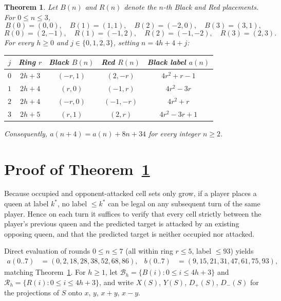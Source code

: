 \documentclass[11pt]{article}
\newtheorem{theorem}{Theorem}
\begin{document}
\begin{theorem}\label{thm:main}
Let $B(n)$ and $R(n)$ denote the $n$-th Black and Red placements. For $0 \le n \le 3$,
\[
  B(0) = (0,0),\quad B(1) = (1,1),\quad B(2) = (-2,0),\quad B(3) = (3,1),
\]
\[
  R(0) = (2,-1),\quad R(1) = (-1,2),\quad R(2) = (-1,-2),\quad R(3) = (2,3).
\]
For every $h \ge 0$ and $j \in \{0, 1, 2, 3\}$, setting $n = 4h + 4 + j$:
\begin{center}
\begin{tabular}{@{}ccccc@{}}
\toprule
$j$ & Ring $r$ & Black $B(n)$ & Red $R(n)$ & Black label $a(n)$ \\
\midrule
$0$ & $2h + 3$ & $(-r, 1)$ & $(2, -r)$ & $4r^2 + r - 1$ \\
$1$ & $2h + 4$ & $(r, 0)$ & $(-1, r)$ & $4r^2 - 3r$ \\
$2$ & $2h + 4$ & $(-r, 0)$ & $(-1, -r)$ & $4r^2 + r$ \\
$3$ & $2h + 5$ & $(r, 1)$ & $(2, r)$ & $4r^2 - 3r + 1$ \\
\bottomrule
\end{tabular}
\end{center}
Consequently, $a(n + 4) = a(n) + 8n + 34$ for every integer $n \ge 2$.
\end{theorem}

\section{Proof of Theorem~\ref{thm:main}}

Because occupied and opponent-attacked cell sets only grow, if a player places a queen at label $k^*$, no label $\le k^*$ can be legal on any subsequent turn of the same player. Hence on each turn it suffices to verify that every cell strictly between the player's previous queen and the predicted target is attacked by an existing opposing queen, and that the predicted target is neither occupied nor attacked.

Direct evaluation of rounds $0 \le n \le 7$ (all within ring $r \le 5$, label $\le 93$) yields
\begin{align*}
  a(0..7) &= (0, 2, 18, 28, 38, 52, 68, 86), &
  b(0..7) &= (9, 15, 21, 31, 47, 61, 75, 93),
\end{align*}
matching Theorem~\ref{thm:main}. For $h \ge 1$, let $\mathcal{B}_h = \{B(i) : 0 \le i \le 4h + 3\}$ and $\mathcal{R}_h = \{R(i) : 0 \le i \le 4h + 3\}$, and write $X(S)$, $Y(S)$, $D_+(S)$, $D_-(S)$ for the projections of $S$ onto $x$, $y$, $x + y$, $x - y$.
\end{document}
